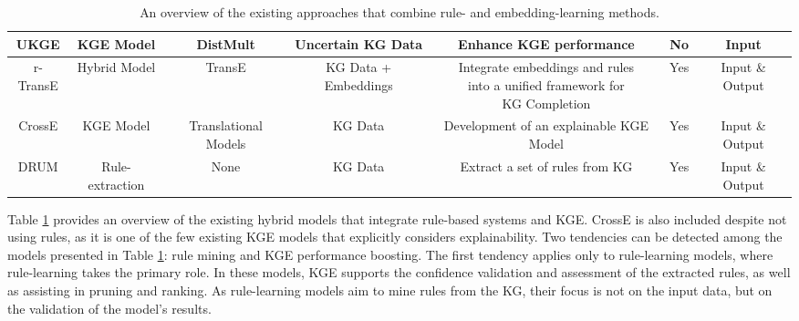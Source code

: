 \begin{table}
{\begin{tabular}{|c|c|c|c|c|c|c|}
UKGE \citep{ukge}             & KGE Model       & DistMult                    & Uncertain KG Data           & Enhance KGE performance                                                               & No                             & Input                   \\ \hline
\makecell{r-TransE\\ \citep{rtranse}}         & Hybrid Model    & TransE                      & KG Data + Embeddings        & \makecell{Integrate embeddings and rules\\ into a unified framework for \\ KG Completion}             & Yes                            & Input \& Output                  \\ \hline
\makecell{CrossE\\ \citep{crosse}}        & KGE Model       & Translational Models        & KG Data                     & Development of an explainable KGE Model                                               & Yes                            & Input \& Output         \\ \hline
\makecell{DRUM\\ \citep{drum}}          & Rule-extraction & None                        & KG Data                     & Extract a set of rules from KG                                                        & Yes                            & Input \& Output  \\ \hline  
\end{tabular}  
 \caption{An overview of the existing approaches that combine rule- and embedding-learning methods.}
\label{tab:rules_kg}
}
\end{table}

Table \ref{tab:rules_kg} provides an overview of the existing hybrid models that integrate rule-based systems and KGE. CrossE \citep{crosse} is also included despite not using rules, as it is one of the few existing KGE models that explicitly considers explainability. Two tendencies can be detected among the models presented in Table \ref{tab:rules_kg}: rule mining and KGE performance boosting. The first tendency applies only to rule-learning models, where rule-learning takes the primary role. In these models, KGE supports the confidence validation and assessment of the extracted rules, as well as assisting in pruning and ranking. As rule-learning models aim to mine rules from the KG, their focus is not on the input data, but on the validation of the model's results.

